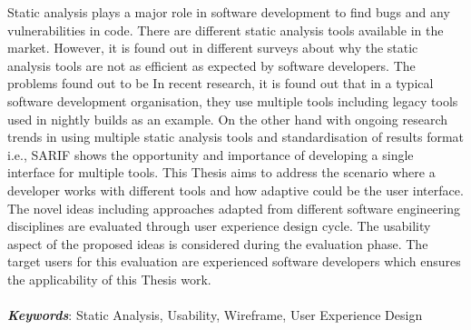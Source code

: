 Static analysis plays a major role in software development to find bugs and any vulnerabilities in code. There are different static analysis tools available in the market. However, it is found out in different surveys about why the static analysis tools are not as efficient as expected by software developers. The problems found out to be  In recent research, it is found out that in a typical software development organisation, they use multiple tools including legacy tools used in nightly builds as an example. On the other hand with ongoing research trends in using multiple static analysis tools and standardisation of results format i.e., SARIF shows the opportunity and importance of developing a single interface for multiple tools. This Thesis aims to address the scenario where a developer works with different tools and how adaptive could be the user interface. The novel ideas including approaches adapted from different software engineering disciplines are evaluated through user experience design cycle. The usability aspect of the proposed ideas is considered during the evaluation phase. The target users for this evaluation are experienced software developers which ensures the applicability of this Thesis work. \\ \\
\textbf{\textit{Keywords}}: Static Analysis, Usability, Wireframe, User Experience Design
